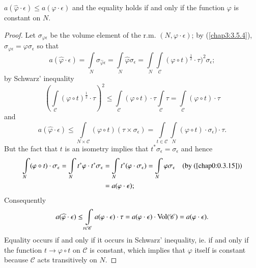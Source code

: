 \subsection{}\label{chap8:8.12.5}

\begin{lemma*}
$a(\widehat{\varphi}\cdot\epsilon)\leq a(\varphi\cdot\epsilon)$ and
  the equality holds if and only if the function $\varphi$ is constant
  on $N$.
\end{lemma*}

\begin{proof}
Let $\sigma_{\varphi\epsilon}$ be the volume element of the r.m.\@
$(N,\varphi\cdot\epsilon)$; by (\ref{chap3:3.5.4}),
$\sigma_{\varphi\epsilon}=\varphi\sigma_{\epsilon}$ so that
$$
a(\widehat{\varphi}\cdot\epsilon)=\int\limits_{N}
\sigma_{\widehat{\varphi}\epsilon}=\int\limits_{N}
\widehat{\varphi}\sigma_{\epsilon}=\int\limits_{N}\int\limits_{\mathscr{C}}(\varphi\circ
t)^{\frac{1}{2}}\cdot\tau)^{2}\sigma_{\epsilon}; 
$$
by Schwarz' inequality
$$
\left(\int\limits_{\mathscr{C}}(\varphi\circ
t)^{\frac{1}{2}}\cdot\tau\right)^{2}\leq
\int\limits_{\mathscr{C}}(\varphi\circ t)\cdot
\tau\int\limits_{\mathscr{C}}\tau
=\int\limits_{\mathscr{C}}(\varphi\circ t)\cdot \tau
$$
and
$$
a(\widehat{\varphi}\cdot\epsilon)\leq
\int\limits_{N\times\mathscr{C}}(\varphi\circ
t)(\tau\times\sigma_{\epsilon})=\int\limits_{t\in\mathscr{C}}\int\limits_{N}(\varphi\circ
t)\cdot \sigma_{\epsilon})\cdot\tau.
$$
But the fact that $t$ is an isometry implies that
$t^{\ast}\sigma_{\epsilon}=\sigma_{\epsilon}$ and hence
\begin{align*}
\int\limits_{N}(\varphi\circ t)\cdot
\sigma_{\epsilon}=\int\limits_{N}t^{\ast}\varphi\cdot
t^{\ast}\sigma_{\epsilon}
&=\int\limits_{N}t^{\ast}(\varphi\cdot\sigma_{\epsilon})=\int\limits_{N}\varphi
\sigma_{\epsilon}\quad\text{(by (\ref{chap0:0.3.15}))}\\
&=a(\varphi\cdot \epsilon);
\end{align*}
Consequently\pageoriginale
$$
a(\widehat{\varphi}\cdot\epsilon)\leq \int\limits_{t\in
  \mathscr{C}}a(\varphi\cdot \epsilon)\cdot\tau =a(\varphi\cdot
\epsilon)\cdot\operatorname{Vol}(\mathscr{C})=a(\varphi\cdot \epsilon). 
$$
Equality occurs if and only if it occurs in Schwarz' inequality, ie.\@
if and only if the function $t\to \varphi\circ t$ on $\mathscr{C}$ is
constant, which implies that $\varphi$ itself is constant because
$\mathscr{C}$ acts transitively on $N$.
\end{proof}

\subsection{}\label{chap8:8.12.6}

